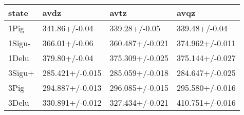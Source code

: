 \begin{tabular}{llll}
\toprule
state & avdz & avtz & avqz \\
\midrule
1Pig & 341.86+/-0.04 & 339.28+/-0.05 & 339.48+/-0.04 \\
1Sigu- & 366.01+/-0.06 & 360.487+/-0.021 & 374.962+/-0.011 \\
1Delu & 379.80+/-0.04 & 375.309+/-0.025 & 375.144+/-0.027 \\
3Sigu+ & 285.421+/-0.015 & 285.059+/-0.018 & 284.647+/-0.025 \\
3Pig & 294.887+/-0.013 & 296.085+/-0.015 & 295.580+/-0.016 \\
3Delu & 330.891+/-0.012 & 327.434+/-0.021 & 410.751+/-0.016 \\
\bottomrule
\end{tabular}
